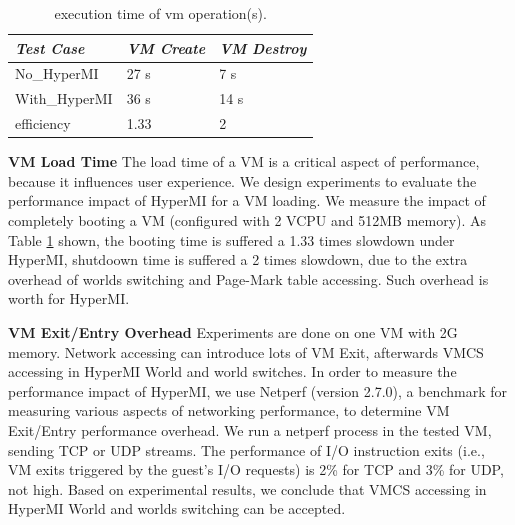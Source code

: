 \documentclass[conference]{IEEEtran}
\begin{document}
\begin{table}
\centering
\caption{execution time of vm operation(s).}\label{tabvm}
\begin{tabular}{p{2cm}|p{1.4cm}|p{1.5cm}}
\hline
{\itshape\bfseries  Test Case} & {\itshape\bfseries VM Create} & {\itshape\bfseries VM Destroy} \\
\hline
No\_HyperMI & 27 s &  7 s\\
\hline
With\_HyperMI & 36 s & 14 s\\ 
\hline
efficiency & 1.33 & 2 \\
\hline
\end{tabular}
\end{table}


\textbf {VM Load Time}
The load time of a VM is a critical aspect of performance, because it influences user experience. We design experiments to evaluate the performance impact of HyperMI for a VM loading.
 We measure the impact of completely booting a VM (configured with 2 VCPU and 512MB memory). As Table \ref{tabvm} shown, the booting time is suffered a 1.33 times slowdown under HyperMI, shutdoown time is suffered a 2 times slowdown, due to the extra overhead of worlds switching and Page-Mark table accessing. Such overhead is worth for HyperMI.

\textbf {VM Exit/Entry Overhead}
Experiments are done on one VM with 2G memory. Network accessing can introduce lots of VM Exit, afterwards VMCS accessing in HyperMI World and world switches. In order to measure the performance impact of HyperMI, we use Netperf (version 2.7.0), a benchmark for measuring various aspects of networking performance, to determine VM Exit/Entry performance overhead. We run a netperf process in the tested VM, sending TCP or UDP streams. The performance of I/O instruction exits (i.e., VM exits triggered by the guest's I/O requests) is 2\% for TCP and 3\% for UDP, not high. 
Based on experimental results, we conclude that VMCS accessing in HyperMI World and worlds switching can be accepted.
\end{document}
